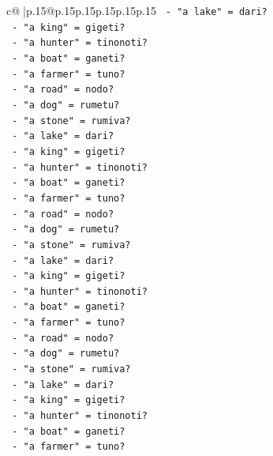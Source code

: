 \documentclass{article}
\begin{document}
{\begin{supertabular}{c@{$\;$}|p{.15\linewidth}@{}p{.15\linewidth}p{.15\linewidth}p{.15\linewidth}p{.15\linewidth}p{.15\linewidth}}
{{{\texttt{                {-} "a lake" = dari?} \\
\texttt{                {-} "a king" = gigeti?} \\
\texttt{                {-} "a hunter" = tinonoti?} \\
\texttt{                {-} "a boat" = ganeti?} \\
\texttt{                {-} "a farmer" = tuno?} \\
\texttt{                {-} "a road" = nodo?} \\
\texttt{                {-} "a dog" = rumetu?} \\
\texttt{                {-} "a stone" = rumiva?} \\
\texttt{                {-} "a lake" = dari?} \\
\texttt{                {-} "a king" = gigeti?} \\
\texttt{                {-} "a hunter" = tinonoti?} \\
\texttt{                {-} "a boat" = ganeti?} \\
\texttt{                {-} "a farmer" = tuno?} \\
\texttt{                {-} "a road" = nodo?} \\
\texttt{                {-} "a dog" = rumetu?} \\
\texttt{                {-} "a stone" = rumiva?} \\
\texttt{                {-} "a lake" = dari?} \\
\texttt{                {-} "a king" = gigeti?} \\
\texttt{                {-} "a hunter" = tinonoti?} \\
\texttt{                {-} "a boat" = ganeti?} \\
\texttt{                {-} "a farmer" = tuno?} \\
\texttt{                {-} "a road" = nodo?} \\
\texttt{                {-} "a dog" = rumetu?} \\
\texttt{                {-} "a stone" = rumiva?} \\
\texttt{                {-} "a lake" = dari?} \\
\texttt{                {-} "a king" = gigeti?} \\
\texttt{                {-} "a hunter" = tinonoti?} \\
\texttt{                {-} "a boat" = ganeti?} \\
\texttt{                {-} "a farmer" = tuno?} \\
}}}
\end{supertabular}}
\end{document}
